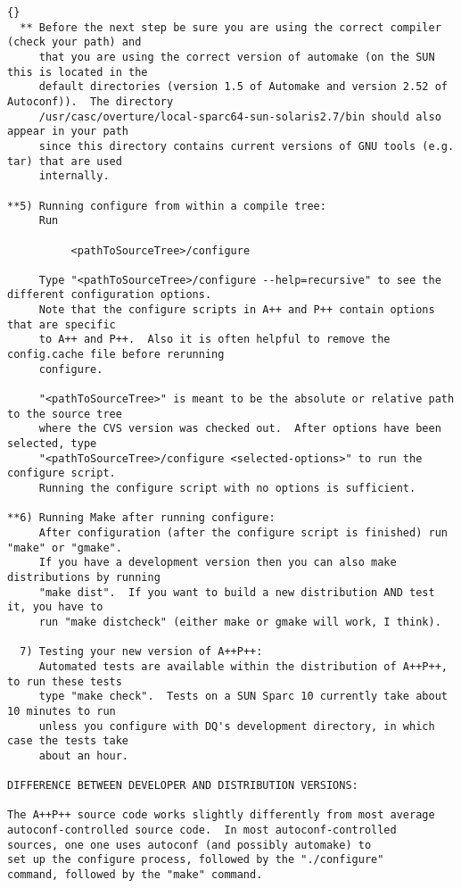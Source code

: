 \documentclass[10pt]{llncs}
\begin{document}
\begin{lstlisting}{}
  ** Before the next step be sure you are using the correct compiler (check your path) and 
     that you are using the correct version of automake (on the SUN this is located in the
     default directories (version 1.5 of Automake and version 2.52 of Autoconf)).  The directory
     /usr/casc/overture/local-sparc64-sun-solaris2.7/bin should also appear in your path
     since this directory contains current versions of GNU tools (e.g. tar) that are used 
     internally.

**5) Running configure from within a compile tree:
     Run

          <pathToSourceTree>/configure

     Type "<pathToSourceTree>/configure --help=recursive" to see the different configuration options.
     Note that the configure scripts in A++ and P++ contain options that are specific
     to A++ and P++.  Also it is often helpful to remove the config.cache file before rerunning
     configure.

     "<pathToSourceTree>" is meant to be the absolute or relative path to the source tree
     where the CVS version was checked out.  After options have been selected, type
     "<pathToSourceTree>/configure <selected-options>" to run the configure script.
     Running the configure script with no options is sufficient.

**6) Running Make after running configure:
     After configuration (after the configure script is finished) run "make" or "gmake".
     If you have a development version then you can also make distributions by running
     "make dist".  If you want to build a new distribution AND test it, you have to
     run "make distcheck" (either make or gmake will work, I think).

  7) Testing your new version of A++P++:
     Automated tests are available within the distribution of A++P++, to run these tests
     type "make check".  Tests on a SUN Sparc 10 currently take about 10 minutes to run
     unless you configure with DQ's development directory, in which case the tests take 
     about an hour.

DIFFERENCE BETWEEN DEVELOPER AND DISTRIBUTION VERSIONS:

The A++P++ source code works slightly differently from most average
autoconf-controlled source code.  In most autoconf-controlled
sources, one one uses autoconf (and possibly automake) to
set up the configure process, followed by the "./configure"
command, followed by the "make" command.


\end{lstlisting}
\end{document}
